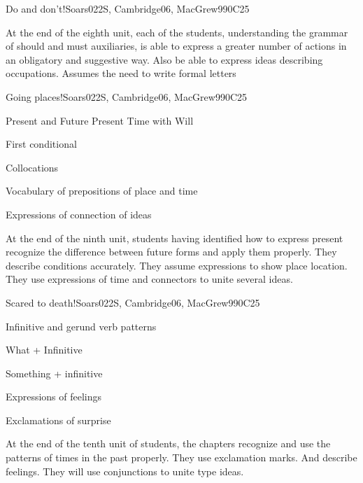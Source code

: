 \begin{syllabus}
\begin{unit}{Do and don't!}{}{Soars022S, Cambridge06, MacGrew99}{0}{C25}
   \begin{learningoutcomes}
      \item At the end of the eighth unit, each of the students, understanding the grammar of should and must auxiliaries, is able to express a greater number of actions in an obligatory and suggestive way.
            Also be able to express ideas describing occupations. Assumes the need to write formal letters
   \end{learningoutcomes}
\end{unit}

\begin{unit}{Going places!}{}{Soars022S, Cambridge06, MacGrew99}{0}{C25}
   \begin{topics}
      \item Present and Future Present Time with Will
      \item First conditional
      \item Collocations
      \item Vocabulary of prepositions of place and time
      \item Expressions of connection of ideas
   \end{topics}

   \begin{learningoutcomes}
      \item At the end of the ninth unit, students having identified how to express present recognize the difference between future forms and apply them properly. They describe conditions accurately. They assume expressions to show place location. They use expressions of time and connectors to unite several ideas.
   \end{learningoutcomes}
\end{unit}

\begin{unit}{Scared to death!}{}{Soars022S, Cambridge06, MacGrew99}{0}{C25}
   \begin{topics}
      \item Infinitive and gerund verb patterns
      \item What + Infinitive
      \item Something + infinitive
      \item Expressions of feelings
      \item Exclamations of surprise
   \end{topics}

   \begin{learningoutcomes}
      \item At the end of the tenth unit of students, the chapters recognize and use the patterns of times in the past properly. They use exclamation marks. And describe feelings. They will use conjunctions to unite type ideas.
   \end{learningoutcomes}
\end{unit}


\end{syllabus}
